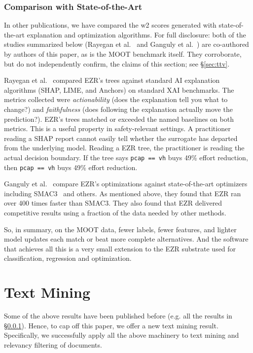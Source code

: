 \documentclass[AMA,STIX2COL]{WileyNJDv5}
\newcommand{\NEW}[1]{\textcolor{newblue}{#1}}
\newcommand{\IT}{{\sffamily EZR}}
\begin{document}
\subsubsection{Comparison with State-of-the-Art}\label{sota}

In other publications, we have compared the \textsf{w2} scores generated
with state-of-the-art explanation and optimization algorithms.
For full disclosure: both of the studies summarized below
(Rayegan et al.~\cite{Amiraliminimaldata} and Ganguly et
al.~\cite{ganguly2026lowgodatalightse}) are \NEW{co-authored by authors of this paper}, as is the MOOT benchmark itself.
They corroborate, but do not independently confirm, the claims
of this section; see \S\ref{sec:ttv}.


Rayegan et al.~\cite{Amiraliminimaldata} compared \IT{}'s trees against
standard AI explanation algorithms
(SHAP, LIME, and Anchors) on standard XAI benchmarks. The metrics collected
were {\em actionability} (does the explanation tell you what to
change?) and {\em faithfulness} (does following the explanation
actually move the prediction?). \IT{}'s trees matched or
exceeded the named baselines on both metrics.
This is a useful property in safety-relevant settings. A
practitioner reading a SHAP report cannot easily tell whether
the surrogate has departed from the underlying model. Reading a
\IT{} tree, the practitioner is reading the actual decision
boundary. If the tree says \texttt{pcap == vh} buys 49\% effort
reduction, then \texttt{pcap == vh} buys 49\% effort reduction.

Ganguly et al.~\cite{ganguly2026lowgodatalightse}    compare \IT{}'s
optimizations against state-of-the-art optimizers including SMAC3~\cite{hutter2011sequential}
and others.
As mentioned above, they found that  EZR ran over 400 times faster than SMAC3. 
They also found that EZR delivered competitive results using a fraction
of the data needed by other methods.

So, in summary,
on the MOOT data, fewer labels,
fewer features, and lighter model updates each match or beat
more complete alternatives. And the software that achieves all
this is a very small extension to the EZR substrate used
for classification, regression and optimization.


\section{Text Mining}\label{sec:textmine}

Some of the above results have been published before (e.g. all the results
in \S\ref{sota}). 
Hence, to cap off this paper,
 we offer a new text mining result. Specifically, we successfully
 apply all the above machinery
 to text mining and relevancy filtering of documents.
 
\end{document}

